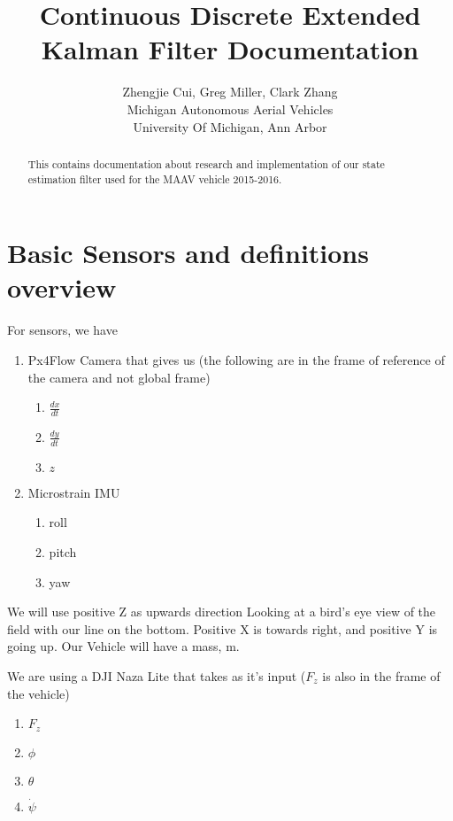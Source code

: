 \documentclass[12pt]{article}
\begin{document}
\title{Continuous Discrete Extended Kalman Filter Documentation}

\author{Zhengjie Cui, Greg Miller, Clark Zhang \\ 
Michigan Autonomous Aerial Vehicles \\
University Of Michigan, Ann Arbor}

\maketitle
\begin{abstract}
This contains documentation about research and implementation of our state estimation filter used for the MAAV vehicle 2015-2016.
\end{abstract}

\section{Basic Sensors and definitions overview}
For sensors, we have
\begin{enumerate}
\item{
Px4Flow Camera that gives us (the following are in the frame of reference of the camera and not global frame)
\begin{enumerate}
\item $\frac{dx}{dt}$
\item $\frac{dy}{dt}$
\item $z$
\end{enumerate}
}
\item{
Microstrain IMU
\begin{enumerate}
\item roll
\item pitch
\item yaw
\end{enumerate}
}
\end{enumerate}

We will use positive Z as upwards direction
Looking at a bird's eye view of the field with our line on the bottom.
Positive X is towards right, and positive Y is going up. Our Vehicle will have a mass, m.

We are using a DJI Naza Lite
that takes as it's input ($F_{z}$ is also in the frame of the vehicle)
\begin{enumerate}
\item $F_{z}$
\item $\phi$
\item $\theta$
\item $\dot{\psi}$
\end{enumerate}
\end{document}
